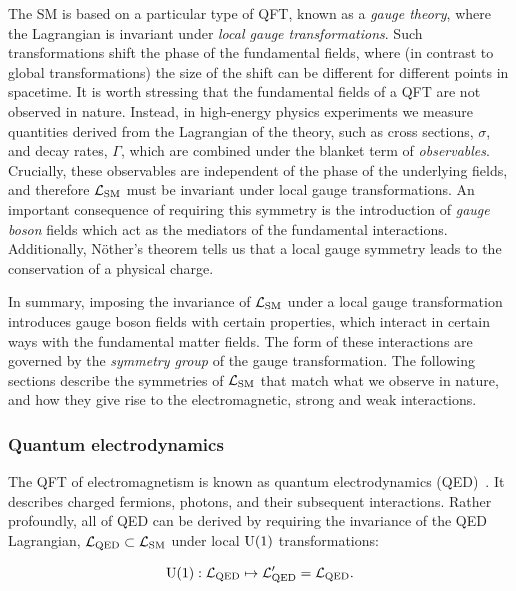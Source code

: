 The SM is based on a particular type of QFT, known as a \textit{gauge theory}, where the Lagrangian is invariant under \textit{local gauge transformations}. Such transformations shift the phase of the fundamental fields, where (in contrast to global transformations) the size of the shift can be different for different points in spacetime. 
It is worth stressing that the fundamental fields of a QFT are not observed in nature. Instead, in high-energy physics experiments we measure quantities derived from the Lagrangian of the theory, such as cross sections, $\sigma$, and decay rates, $\Gamma$, which are combined under the blanket term of \textit{observables}. Crucially, these observables are independent of the phase of the underlying fields, and therefore $\mathcal{L}_{\rm{SM}}$ must be invariant under local gauge transformations. An important consequence of requiring this symmetry is the introduction of \textit{gauge boson} fields which act as the mediators of the fundamental interactions. Additionally, N\"{o}ther's theorem tells us that a local gauge symmetry leads to the conservation of a physical charge.

In summary, imposing the invariance of $\mathcal{L}_{\rm{SM}}$ under a local gauge transformation introduces gauge boson fields with certain properties, which interact in certain ways with the fundamental matter fields. The form of these interactions are governed by the \textit{symmetry group} of the gauge transformation. The following sections describe the symmetries of $\mathcal{L}_{\rm{SM}}$ that match what we observe in nature, and how they give rise to the electromagnetic, strong and weak interactions.

\subsubsection{Quantum electrodynamics}
The QFT of electromagnetism is known as quantum electrodynamics (QED)~\cite{Aitchison:2003tq}. It describes charged fermions, photons, and their subsequent interactions. Rather profoundly, all of QED can be derived by requiring the invariance of the QED Lagrangian, $\mathcal{L}_{\rm{QED}} \subset \mathcal{L}_{\rm{SM}}$ under local ${\rm{U}}(1)$ transformations:

\begin{equation}\label{eq:u1_gaugeinvariance}
    {\rm{U}}(1): \mathcal{L}_{\rm{QED}} \mapsto \mathcal{L}'_{\rm{QED}} = \mathcal{L}_{\rm{QED}}.
\end{equation}

